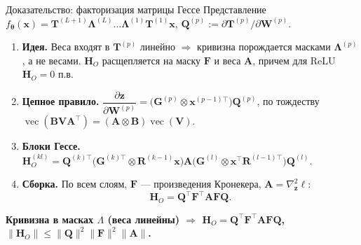 \documentclass[9pt,pdf,hyperref={unicode}]{beamer}
\newcommand{\key}[1]{\par\vspace{0.5ex}\noindent\textbf{\color{darkgreen}#1}}
\begin{document}
\begin{frame}{Доказательство: факторизация матрицы Гессе}
\justifying
\footnotesize
\vspace{-2pt}
Представление $f_{\boldsymbol{\theta}}(\mathbf{x})=\mathbf{T}^{(L+1)}\boldsymbol{\Lambda}^{(L)}\dots\boldsymbol{\Lambda}^{(1)}\mathbf{T}^{(1)}\mathbf{x}$, $\mathbf{Q}^{(p)}:=\partial\mathbf{T}^{(p)}/\partial\mathbf{W}^{(p)}$.
\begin{enumerate}[1)]
    \item \textbf{Идея.} Веса входят в $\mathbf{T}^{(p)}$ линейно $\Rightarrow$ кривизна порождается масками $\boldsymbol{\Lambda}^{(p)}$, а не весами. $\mathbf{H}_O$ расщепляется на маску $\mathbf{F}$ и веса $\mathbf{A}$, причем для ReLU $\mathbf{H}_O=0$ п.в.
    \item \textbf{Цепное правило.} $\dfrac{\partial\mathbf{z}}{\partial\mathbf{W}^{(p)}}=\bigl(\mathbf{G}^{(p)}\otimes\mathbf{x}^{(p-1)\top}\bigr)\mathbf{Q}^{(p)}$, по тождеству $\operatorname{vec}(\mathbf{B}\mathbf{V}\mathbf{A}^{\top})=(\mathbf{A}\otimes\mathbf{B})\operatorname{vec}(\mathbf{V})$.
    \item \textbf{Блоки Гессе.} $\mathbf{H}_O^{(kl)}=\mathbf{Q}^{(k)\top}\bigl(\mathbf{G}^{(k)\top}\otimes\mathbf{R}^{(k-1)}\mathbf{x}\bigr)\mathbf{A}\bigl(\mathbf{G}^{(l)}\otimes\mathbf{x}^{\top}\mathbf{R}^{(l-1)\top}\bigr)\mathbf{Q}^{(l)}$.
    \item \textbf{Сборка.} По всем слоям, $\mathbf{F}$ --- произведения Кронекера, $\mathbf{A}=\nabla^2_{\mathbf{z}}\ell$:
    \[
        \mathbf{H}_O=\mathbf{Q}^{\top}\mathbf{F}^{\top}\mathbf{A}\mathbf{F}\mathbf{Q}.
    \]
\end{enumerate}
\vspace{-2pt}
\key{Кривизна в масках $\Lambda$ (веса линейны) $\Rightarrow$ $\mathbf{H}_O=\mathbf{Q}^{\top}\mathbf{F}^{\top}\mathbf{A}\mathbf{F}\mathbf{Q}$, $\|\mathbf{H}_O\|\le\|\mathbf{Q}\|^2\|\mathbf{F}\|^2\|\mathbf{A}\|$.}
\end{frame}
\end{document}
